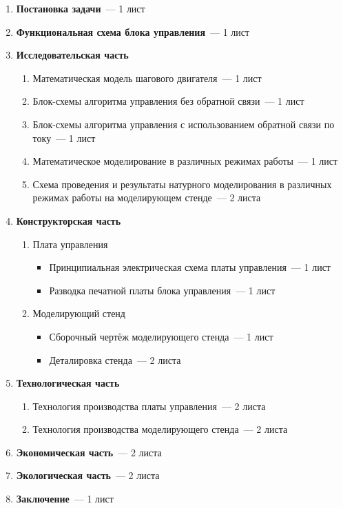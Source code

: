 \begin{enumerate}
    \item \textbf{Постановка задачи}~--- 1 лист
    \item \textbf{Функциональная схема блока управления}~--- 1 лист

    \item \textbf{Исследовательская часть}
    \begin{enumerate}
        \item Математическая модель шагового двигателя~--- 1 лист
        \item Блок-схемы алгоритма управления без обратной связи~--- 1 лист
        \item Блок-схемы алгоритма управления с использованием обратной связи по току~--- 1 лист
        \item Математическое моделирование в различных режимах работы~--- 1 лист
        \item Схема проведения и результаты натурного моделирования в различных режимах работы на моделирующем стенде~--- 2 листа
    \end{enumerate}

    \item \textbf{Конструкторская часть}
    \begin{enumerate}
        \item Плата управления
        \begin{itemize}
            \item Принципиальная электрическая схема платы управления~--- 1 лист
            \item Разводка печатной платы блока управления~--- 1 лист
        \end{itemize}
        \item Моделирующий стенд
        \begin{itemize}
            \item Сборочный чертёж моделирующего стенда~--- 1 лист
            \item Деталировка стенда~--- 2 листа
        \end{itemize}
    \end{enumerate}

    \item \textbf{Технологическая часть}
    \begin{enumerate}
        \item Технология производства платы управления~--- 2 листа
        \item Технология производства моделирующего стенда~--- 2 листа
    \end{enumerate}

    \item \textbf{Экономическая часть}~--- 2 листа
    \item \textbf{Экологическая часть}~--- 2 листа
    \item \textbf{Заключение}~--- 1 лист
\end{enumerate}

